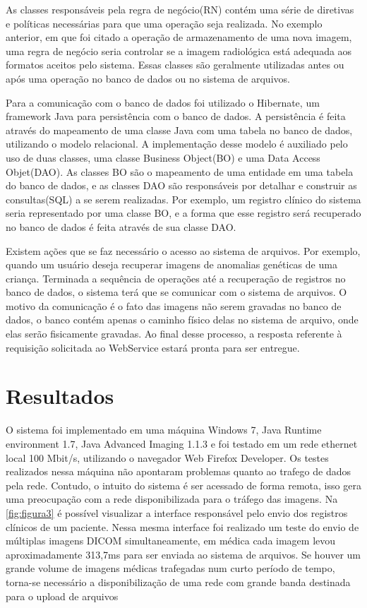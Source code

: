 As classes responsáveis pela regra de negócio(RN) contém uma série de diretivas e políticas necessárias para que uma operação seja realizada.
No exemplo anterior, em que foi citado a operação de armazenamento de uma nova imagem, uma regra de negócio seria controlar se a imagem radiológica está adequada aos formatos aceitos pelo sistema.
Essas classes são geralmente utilizadas antes ou após uma operação no banco de dados ou no sistema de arquivos.

Para a comunicação com o banco de dados foi utilizado o Hibernate, um framework Java para persistência com o banco de dados.
A persistência é feita através do mapeamento de uma classe Java com uma tabela no banco de dados, utilizando o modelo relacional.
A implementação desse modelo é auxiliado pelo uso de duas classes, uma classe Business Object(BO) e uma Data Access Objet(DAO).
As classes BO são o mapeamento de uma entidade em uma tabela do banco de dados, e as classes DAO são responsáveis por detalhar e construir as consultas(SQL) a se serem realizadas.
Por exemplo, um registro clínico do sistema seria representado por uma classe BO, e a forma que esse registro será recuperado no banco de dados é feita através de sua classe DAO.

Existem ações que se faz necessário o acesso ao sistema de arquivos.
Por exemplo, quando um usuário deseja recuperar imagens de anomalias genéticas de uma criança.
Terminada a sequência de operações até a recuperação de registros no banco de dados, o sistema terá que se comunicar com o sistema de arquivos.
O motivo da comunicação é o fato das imagens não serem gravadas no banco de dados, o banco contém apenas o caminho físico delas no sistema de arquivo, onde elas serão fisicamente gravadas.
Ao final desse processo, a resposta referente à requisição solicitada ao WebService estará pronta para ser entregue.

\section{\esp Resultados}

O sistema foi implementado em uma máquina Windows 7, Java Runtime environment 1.7, Java Advanced Imaging 1.1.3 e foi testado em um rede ethernet local 100 Mbit/s, utilizando o navegador Web Firefox Developer. Os testes realizados nessa máquina não apontaram problemas quanto ao trafego de dados pela rede. Contudo, o intuito do sistema é ser acessado de forma remota, isso gera uma preocupação com a rede disponibilizada para o tráfego das imagens. Na \ref{fig:figura3} é possível visualizar a interface responsável pelo envio dos registros clínicos de um paciente. Nessa mesma interface foi realizado um teste do envio de múltiplas imagens DICOM simultaneamente, em médica cada imagem levou aproximadamente 313,7ms para ser enviada ao sistema de arquivos. Se houver um grande volume de imagens médicas trafegadas num curto período de tempo, torna-se necessário a disponibilização de uma rede com grande banda destinada para o upload de arquivos


